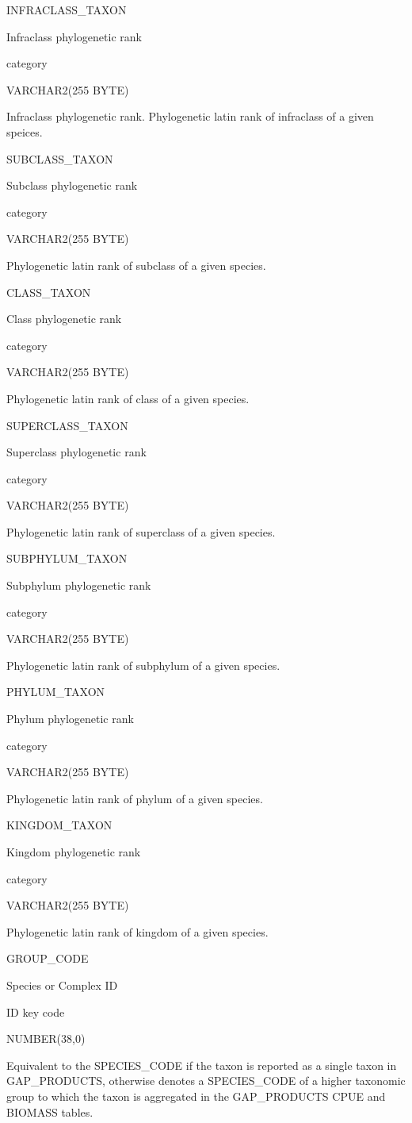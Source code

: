 \documentclass[
  letterpaper,
  oneside,
  open=any]{scrbook}
\begin{document}
INFRACLASS\_TAXON

Infraclass phylogenetic rank

category

VARCHAR2(255 BYTE)

Infraclass phylogenetic rank. Phylogenetic latin rank of infraclass of a
given speices.

SUBCLASS\_TAXON

Subclass phylogenetic rank

category

VARCHAR2(255 BYTE)

Phylogenetic latin rank of subclass of a given species.

CLASS\_TAXON

Class phylogenetic rank

category

VARCHAR2(255 BYTE)

Phylogenetic latin rank of class of a given species.

SUPERCLASS\_TAXON

Superclass phylogenetic rank

category

VARCHAR2(255 BYTE)

Phylogenetic latin rank of superclass of a given species.

SUBPHYLUM\_TAXON

Subphylum phylogenetic rank

category

VARCHAR2(255 BYTE)

Phylogenetic latin rank of subphylum of a given species.

PHYLUM\_TAXON

Phylum phylogenetic rank

category

VARCHAR2(255 BYTE)

Phylogenetic latin rank of phylum of a given species.

KINGDOM\_TAXON

Kingdom phylogenetic rank

category

VARCHAR2(255 BYTE)

Phylogenetic latin rank of kingdom of a given species.

GROUP\_CODE

Species or Complex ID

ID key code

NUMBER(38,0)

Equivalent to the SPECIES\_CODE if the taxon is reported as a single
taxon in GAP\_PRODUCTS, otherwise denotes a SPECIES\_CODE of a higher
taxonomic group to which the taxon is aggregated in the GAP\_PRODUCTS
CPUE and BIOMASS tables.
\end{document}
